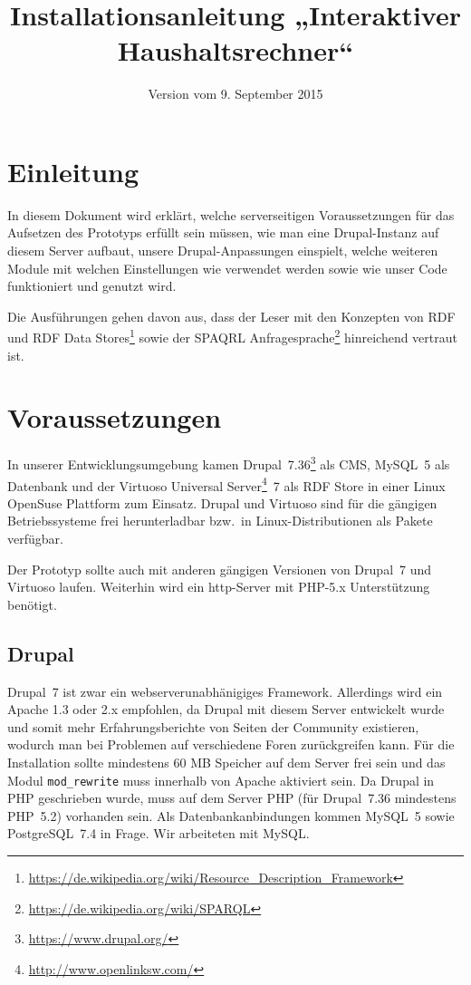 \documentclass[a4paper,11pt,twoside]{article}
\title{Installationsanleitung „Interaktiver Haushaltsrechner“}
\date{Version vom 9. September 2015}
\begin{document}
\maketitle
\tableofcontents
\newpage
\seitezwei
\newpage

\section{Einleitung}
In diesem Dokument wird erklärt, welche serverseitigen Voraussetzungen für das
Aufsetzen des Prototyps erfüllt sein müssen, wie man eine Drupal-Instanz auf
diesem Server aufbaut, unsere Drupal-Anpassungen einspielt, welche weiteren
Module mit welchen Einstellungen wie verwendet werden sowie wie unser Code
funktioniert und genutzt wird.

Die Ausführungen gehen davon aus, dass der Leser mit den Konzepten von RDF und
RDF Data
Stores\footnote{\url{https://de.wikipedia.org/wiki/Resource_Description_Framework}}
sowie der SPAQRL
Anfragesprache\footnote{\url{https://de.wikipedia.org/wiki/SPARQL}}
hinreichend vertraut ist.

\section{Voraussetzungen}
In unserer Entwicklungsumgebung kamen
Drupal~7.36\footnote{\url{https://www.drupal.org/}} als CMS, MySQL~5 als
Datenbank und der Virtuoso Universal
Server\footnote{\url{http://www.openlinksw.com/}}~7 als RDF Store in einer
Linux OpenSuse Plattform zum Einsatz.  Drupal und Virtuoso sind für die
gängigen Betriebssysteme frei herunterladbar bzw.\ in Linux-Distributionen als
Pakete verfügbar.  

Der Prototyp sollte auch mit anderen gängigen Versionen von Drupal~7 und
Virtuoso laufen.  Weiterhin wird ein http-Server mit PHP-5.x Unterstützung
benötigt.

\subsection{Drupal}

Drupal~7 ist zwar ein webserverunabhänigiges Framework. Allerdings wird ein
Apache 1.3 oder 2.x empfohlen, da Drupal mit diesem Server entwickelt wurde
und somit mehr Erfahrungsberichte von Seiten der Community existieren, wodurch
man bei Problemen auf verschiedene Foren zurückgreifen kann. Für die
Installation sollte mindestens 60 MB Speicher auf dem Server frei sein und das
Modul \texttt{mod\_rewrite} muss innerhalb von Apache aktiviert sein. Da
Drupal in PHP geschrieben wurde, muss auf dem Server PHP (für Drupal~7.36
mindestens PHP~5.2) vorhanden sein. Als Datenbankanbindungen kommen MySQL~5
sowie PostgreSQL~7.4 in Frage. Wir arbeiteten mit MySQL.
\end{document}
